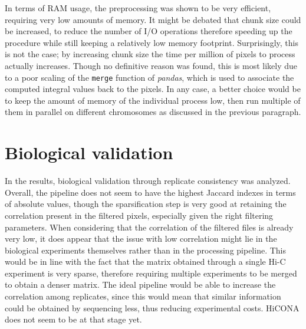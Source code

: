 In terms of RAM usage, the preprocessing was shown to be very efficient, requiring very low amounts of memory. It might be debated that chunk size could be increased, to reduce the number of I/O operations therefore speeding up the procedure while still keeping a relatively low memory footprint. Surprisingly, this is not the case; by increasing chunk size the time per million of pixels to process actually increases. Though no definitive reason was found, this is most likely due to a poor scaling of the \texttt{merge} function of \textit{pandas}, which is used to associate the computed integral values back to the pixels. In any case, a better choice would be to keep the amount of memory of the individual process low, then run multiple of them in parallel on different chromosomes as discussed in the previous paragraph. 

\section{Biological validation}

In the results, biological validation through replicate consistency was analyzed. Overall, the pipeline does not seem to have the highest Jaccard indexes in terms of absolute values, though the sparsification step is very good at retaining the correlation present in the filtered pixels, especially given the right filtering parameters. When considering that the correlation of the filtered files is already very low, it does appear that the issue with low correlation might lie in the biological experiments themselves rather than in the processing pipeline. This would be in line with the fact that the matrix obtained through a single Hi-C experiment is very sparse, therefore requiring multiple experiments to be merged to obtain a denser matrix. The ideal pipeline would be able to increase the correlation among replicates, since this would mean that similar information could be obtained by sequencing less, thus reducing experimental costs. HiCONA does not seem to be at that stage yet.

